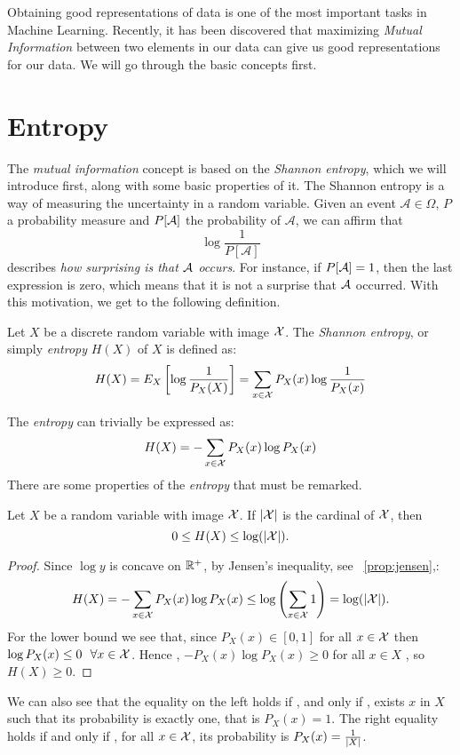 Obtaining good representations of data is one of the most important tasks in Machine Learning. 
Recently, it has been discovered that maximizing \emph{Mutual Information} between two elements in our data can give us good representations for our data. We will go through the basic concepts first.


\section{Entropy}

The \emph{mutual information} concept is based on the \emph{Shannon entropy}, which we will introduce first, along with some basic properties of it. The Shannon entropy is a way of measuring the uncertainty in a random variable. Given an event $\mathcal A \in \Omega$, $P$ a probability measure and $P[\mathcal A]$ the probability of $\mathcal A$, we can affirm that 
$$
\log\frac{1}{P[\mathcal A]}
$$
describes \emph{how surprising is that $\mathcal A$ occurs}. For instance, if $P[\mathcal A] = 1$, then the last expression is zero, which means that it is not a surprise that $\mathcal A$ occurred. With this motivation, we get to the following definition.


\begin{ndef}
Let $X$ be a discrete random variable with image $\mathcal{X}$. The \emph{Shannon entropy}, or simply \emph{entropy}  $H(X)$ of $X$ is defined as:
$$
H(X) = E_X\left[\log\frac{1}{P_X(X)}\right] =  \sum_{x \in \mathcal{X}} P_X(x) \log\frac{1}{P_X(x)}
$$
\end{ndef}
The \emph{entropy} can trivially be expressed as:
$$
H(X) = - \sum_{x \in \mathcal{X}}P_X (x)\log P_X(x)
$$
There are some properties of the \emph{entropy} that must be remarked. 
\begin{nprop}\label{entr:prop:1}
    Let $X$ be a random variable with image $\mathcal{X}$. If $|\mathcal{X}|$ is the cardinal of $\mathcal{X}$, then
    $$
0 \leq H(X) \leq \log(|\mathcal{X}|).
    $$
\end{nprop}
\begin{proof}
    Since $\log y$ is concave on $\mathbb{R}^+$, by Jensen's inequality, see ~\cref{prop:jensen},:
    $$
    H(X) = - \sum_{x \in \mathcal{X}}P_X (x)\log P_X(x) \leq \log\left(\sum_{x \in \mathcal{X}} 1\right) = \log(|\mathcal{X}|).
    $$
    For the lower bound we see that, since $P_X(x) \in [0,1]$ for all  $x \in \mathcal{X} $ then $\log P_X(x) \leq 0 \ \ \forall x \in \mathcal{X}$. Hence , $-P_X(x) \log P_X(x) \geq 0$ for all $x \in X$ , so $H(X) \geq 0$.
\end{proof}
We can also see that the equality on the left holds if , and only if , exists $ x $ in  $X$ such that its probability is exactly one, that is $P_X(x) = 1$. The right equality holds if and only if , for all $x \in \mathcal{X}$, its probability is $P_X(x) = \frac{1}{\lvert X\rvert}$.

